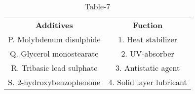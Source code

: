 \begin{table}[htbp]
  \centering
  \caption{Table-7}
  \label{table7}
  \begin{tabular}{cc}
\textbf{Additives} & \textbf{Fuction}\\

P. Molybdenum disulphide & 1. Heat stabilizer \\
Q. Glycerol monostearate & 2. UV-absorber \\
R. Tribasic lead sulphate & 3. Antistatic agent \\
S. 2-hydroxybenzophenone & 4. Solid layer lubricant \\
  
  
  
  \end{tabular}
\end{table}